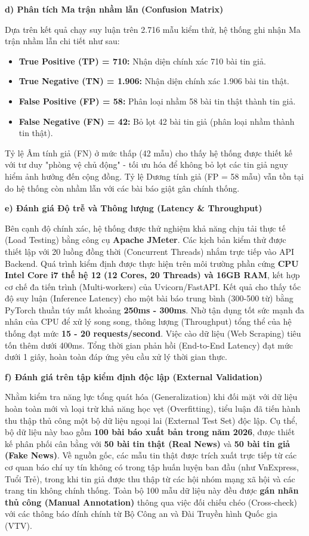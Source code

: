 \documentclass[12pt,a4paper]{article}
\begin{document}
\textbf{d) Phân tích Ma trận nhầm lẫn (Confusion Matrix)}

Dựa trên kết quả chạy suy luận trên 2.716 mẫu kiểm thử, hệ thống ghi nhận Ma trận nhầm lẫn chi tiết như sau:
\begin{itemize}[label={--},leftmargin=0.75cm,itemsep=3pt]
    \item \textbf{True Positive (TP) = 710:} Nhận diện chính xác 710 bài tin giả.
    \item \textbf{True Negative (TN) = 1.906:} Nhận diện chính xác 1.906 bài tin thật.
    \item \textbf{False Positive (FP) = 58:} Phân loại nhầm 58 bài tin thật thành tin giả.
    \item \textbf{False Negative (FN) = 42:} Bỏ lọt 42 bài tin giả (phân loại nhầm thành tin thật).
\end{itemize}
Tỷ lệ Âm tính giả (FN) ở mức thấp (42 mẫu) cho thấy hệ thống được thiết kế với tư duy "phòng vệ chủ động" - tối ưu hóa để không bỏ lọt các tin giả nguy hiểm ảnh hưởng đến cộng đồng. Tỷ lệ Dương tính giả (FP = 58 mẫu) vẫn tồn tại do hệ thống còn nhầm lẫn với các bài báo giật gân chính thống.

\textbf{e) Đánh giá Độ trễ và Thông lượng (Latency \& Throughput)}

Bên cạnh độ chính xác, hệ thống được thử nghiệm khả năng chịu tải thực tế (Load Testing) bằng công cụ \textbf{Apache JMeter}. Các kịch bản kiểm thử được thiết lập với 20 luồng đồng thời (Concurrent Threads) nhắm trực tiếp vào API Backend. Quá trình kiểm định được thực hiện trên môi trường phần cứng \textbf{CPU Intel Core i7 thế hệ 12 (12 Cores, 20 Threads) và 16GB RAM}, kết hợp cơ chế đa tiến trình (Multi-workers) của Uvicorn/FastAPI. Kết quả cho thấy tốc độ suy luận (Inference Latency) cho một bài báo trung bình (300-500 từ) bằng PyTorch thuần túy mất khoảng \textbf{250ms - 300ms}. Nhờ tận dụng tốt sức mạnh đa nhân của CPU để xử lý song song, thông lượng (Throughput) tổng thể của hệ thống đạt mức \textbf{15 - 20 requests/second}. Việc cào dữ liệu (Web Scraping) tiêu tốn thêm dưới 400ms. Tổng thời gian phản hồi (End-to-End Latency) đạt mức dưới 1 giây, hoàn toàn đáp ứng yêu cầu xử lý thời gian thực.

\textbf{f) Đánh giá trên tập kiểm định độc lập (External Validation)}

Nhằm kiểm tra năng lực tổng quát hóa (Generalization) khi đối mặt với dữ liệu hoàn toàn mới và loại trừ khả năng học vẹt (Overfitting), tiểu luận đã tiến hành thu thập thủ công một bộ dữ liệu ngoại lai (External Test Set) độc lập. Cụ thể, bộ dữ liệu này bao gồm \textbf{100 bài báo xuất bản trong năm 2026}, được thiết kế phân phối cân bằng với \textbf{50 bài tin thật (Real News)} và \textbf{50 bài tin giả (Fake News)}. Về nguồn gốc, các mẫu tin thật được trích xuất trực tiếp từ các cơ quan báo chí uy tín không có trong tập huấn luyện ban đầu (như VnExpress, Tuổi Trẻ), trong khi tin giả được thu thập từ các hội nhóm mạng xã hội và các trang tin không chính thống. Toàn bộ 100 mẫu dữ liệu này đều được \textbf{gán nhãn thủ công (Manual Annotation)} thông qua việc đối chiếu chéo (Cross-check) với các thông báo đính chính từ Bộ Công an và Đài Truyền hình Quốc gia (VTV).
\end{document}
